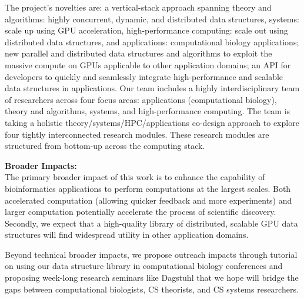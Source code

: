 The project’s novelties are: a vertical-stack approach spanning theory and algorithms: highly concurrent, dynamic, and distributed data structures, systems: scale up using GPU acceleration, high-performance computing: scale out using distributed data structures, and applications: computational biology applications; new parallel and distributed data structures and algorithms to exploit the massive compute on GPUs applicable to other application domains; an API for developers to quickly and seamlessly integrate high-performance and scalable data structures in applications.
%
Our team includes a highly interdisciplinary team of researchers across four focus areas: applications (computational biology), theory and algorithms, systems, and high-performance computing. The team is taking a holistic theory/systems/HPC/applications co-design approach to explore four tightly interconnected research modules. These research modules are structured from bottom-up across the computing stack.

\noindent \textbf{\large Broader Impacts: }\\
The primary broader impact of this work is to enhance the capability of bioinformatics applications to perform computations at the largest scales. Both accelerated computation (allowing quicker feedback and more experiments) and larger computation potentially accelerate the process of scientific discovery. Secondly, we expect that a high-quality library of distributed, scalable GPU data structures will find widespread utility in other application domains.

Beyond technical broader impacts, we propose outreach impacts through tutorial on using our data structure library in computational biology conferences and proposing week-long research seminars like Dagstuhl that we hope will bridge the gaps between computational biologists, CS theorists, and CS systems researchers.
